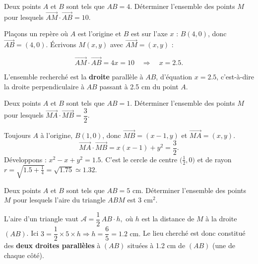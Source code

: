 \documentclass[a4paper,12pt]{article}
\begin{document}
\begin{exercice}
Deux points $A$ et $B$ sont tels que $AB=4$.
Déterminer l’ensemble des points $M$ pour lesquels
$\overrightarrow{AM}\cdot\overrightarrow{AB}=10$.
\end{exercice}

\begin{solution}[Correction]
Plaçons un repère où $A$ est l’origine et $B$ est sur l’axe $x$ :
$B(4,0)$, donc $\vec{AB}=(4,0)$.
Écrivons $M(x,y)$ avec $\vec{AM}=(x,y)$ :

\[
\vec{AM}\cdot\vec{AB}=4x=10\quad\Longrightarrow\quad x=2.5.
\]

L’ensemble recherché est la \textbf{droite} parallèle à $AB$,
d’équation $x=2.5$, c’est-à-dire la droite perpendiculaire à $AB$ passant
à 2.5 cm du point $A$.
\end{solution}

\begin{exercice}
Deux points $A$ et $B$ sont tels que $AB=1$.
Déterminer l’ensemble des points $M$ pour lesquels
$\overrightarrow{MA}\cdot\overrightarrow{MB}=\dfrac32$.
\end{exercice}

\begin{solution}[Correction]
Toujours $A$ à l’origine, $B(1,0)$, donc
$\vec{MB}=(x-1,y)$ et $\vec{MA}=(x,y)$.
\[
\vec{MA}\cdot\vec{MB}=x(x-1)+y^2=\frac32.
\]
Développons :
\(
x^{2}-x + y^{2}=1.5.
\)
C’est le cercle de centre $\bigl(\tfrac12,0\bigr)$ et de rayon
$r=\sqrt{1.5+\tfrac14}= \sqrt{1.75}\simeq1.32$.
\end{solution}

\begin{exercice}
Deux points $A$ et $B$ sont tels que $AB=5$ cm.
Déterminer l’ensemble des points $M$ pour lesquels l’aire du triangle
$ABM$ est $3$ cm$^{2}$.
\end{exercice}

\begin{solution}[Correction]
L’aire d’un triangle vaut
\(
\mathcal A=\dfrac12\,AB\cdot h,
\)
où $h$ est la distance de $M$ à la droite $(AB)$.
Ici
\(
3=\dfrac12\times5\times h\Longrightarrow h=\dfrac{6}{5}=1.2\text{ cm}.
\)
Le lieu cherché est donc constitué des \textbf{deux droites parallèles}
à $(AB)$ situées à 1.2 cm de $(AB)$ (une de chaque côté).
\end{solution}
\end{document}
